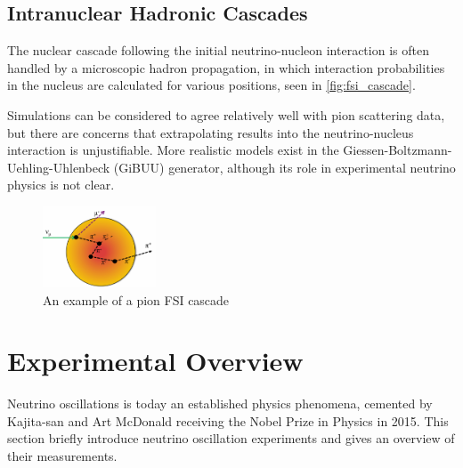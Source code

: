 \subsection{Intranuclear Hadronic Cascades}
The nuclear cascade following the initial neutrino-nucleon interaction is often handled by a microscopic hadron propagation, in which interaction probabilities in the nucleus are calculated for various positions, seen in \autoref{fig:fsi_cascade}. 

Simulations can be considered to agree relatively well with pion scattering data\cite{thesis_elder}, but there are concerns that extrapolating results into the neutrino-nucleus interaction is unjustifiable\cite{ulrich_review}. More realistic models exist in the Giessen-Boltzmann-Uehling-Uhlenbeck (GiBUU)\cite{gibuu} generator, although its role in experimental neutrino physics is not clear.
\begin{figure}[h]
	\centering
	\includegraphics[width=0.3\textwidth, trim={0mm 0mm 0mm 0mm}, clip,page=1]{figures/niwg/diagrams/cascade}
	\caption{An example of a pion FSI cascade}
	\label{fig:fsi_cascade}
\end{figure}

\section{Experimental Overview}
\label{sec:exp_overview}
Neutrino oscillations is today an established physics phenomena, cemented by Kajita-san and Art McDonald receiving the Nobel Prize in Physics in 2015. This section briefly introduce neutrino oscillation experiments and gives an overview of their measurements.

